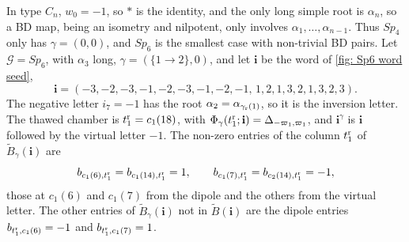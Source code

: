 \documentclass[a4paper]{amsart}
\numberwithin{equation}{section}
\theoremstyle{definition}
\theoremstyle{remark}
\newcommand{\mcG}{\mathcal{G}}
\newcommand{\bfi}{\mathbf{i}}
\newcommand{\tB}{\widetilde{B}}
\newcommand{\rr}{{\rm r}}
\begin{document}
\begin{example}
  \label{ex: Sp6}
  In type $C_n$, $w_0=-1$, so $*$ is the identity, and the only long simple root is $\alpha_n$, so a BD map, being an isometry and nilpotent, only involves $\alpha_1,\dots,\alpha_{n-1}$.
  Thus $Sp_4$ only has $\gamma=(0,0)$, and $Sp_6$ is the smallest case with non-trivial BD pairs.
  Let $\mcG=Sp_6$, with $\alpha_3$ long, $\gamma=(\{1\to2\},0)$, and let $\bfi$ be the word of \cref{fig: Sp6 word seed},
  \[
    \bfi=(-3,-2,-3,-1,-2,-3,-1,-2,-1,\,1,2,1,3,2,1,3,2,3).
  \]
  The negative letter $i_7=-1$ has the root $\alpha_2=\alpha_{\gamma_{\rr}(1)}$, so it is the inversion letter.
  The thawed chamber is $t^\rr_1=c_1(18)$, with $\Phi_\gamma(t^\rr_1;\bfi)=\Delta_{-\varpi_1,\varpi_1}$, and $\bfi^\gamma$ is $\bfi$ followed by the virtual letter $-1$.
  The non-zero entries of the column $t^\rr_1$ of $\tB_\gamma(\bfi)$ are
  \[
    b_{c_1(6),t^\rr_1}=b_{c_1(14),t^\rr_1}=1,
    \qquad
    b_{c_1(7),t^\rr_1}=b_{c_2(14),t^\rr_1}=-1,
  \]
  those at $c_1(6)$ and $c_1(7)$ from the dipole and the others from the virtual letter.
  The other entries of $\tB_\gamma(\bfi)$ not in $\tB(\bfi)$ are the dipole entries $b_{t^\rr_1,c_1(6)}=-1$ and $b_{t^\rr_1,c_1(7)}=1$.


\end{example}
\end{document}
